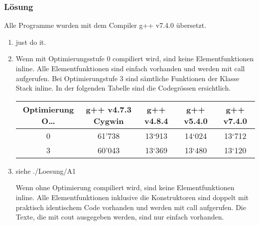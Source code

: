 \subsubsection{Lösung}
Alle Programme wurden mit dem Compiler g++ v7.4.0 übersetzt.
\begin{enumerate}
  \item just do it.
  \item  Wenn mit Optimierungsstufe 0 compiliert wird, sind keine Elementfunktionen inline. Alle Elementfunktionen sind einfach vorhanden und werden mit call aufgerufen. Bei Optimierungstufe 3 sind sämtliche Funktionen der Klasse Stack inline. In der folgenden Tabelle sind die Codegrössen ersichtlich.
\begin{center}
  \begin{tabular}{c c c c c}
    \hline
    \hline
    Optimierung O… & g++ v4.7.3 Cygwin & g++ v4.8.4  & g++ v5.4.0 & g++ v7.4.0 \\
    \hline
    0 &
    61'738&
    13‘913&
    14‘024&
    13‘712\\
    3&
    60'043&
    13‘369&
    13‘480&
    13‘120\\
    \hline
    \hline
  \end{tabular}
\end{center}

  \item siehe ./Loesung/A1


\noindent\makebox[\linewidth]{\rule{\paperwidth}{0.4pt}}

\noindent\makebox[\linewidth]{\rule{\paperwidth}{0.4pt}}

\noindent\makebox[\linewidth]{\rule{\paperwidth}{0.4pt}}

\noindent\makebox[\linewidth]{\rule{\paperwidth}{0.4pt}}


  Wenn ohne Optimierung compiliert wird, sind keine Elementfunktionen inline. Alle Elementfunktionen inklusive die Konstruktoren sind doppelt mit praktisch identischem Code vorhanden und werden mit call aufgerufen. Die Texte, die mit cout ausgegeben werden, sind nur einfach vorhanden.


\end{enumerate}
